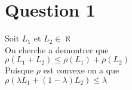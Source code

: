 \section{Question 1}
Soit $L_1$ et $L_2 \in \aleph$ \\

On cherche a demontrer que \\
$\rho(L_1 + L_2) \leq   \rho(L_1)  + \rho(L_2)$\\

Puisque $\rho$ est convexe on a que \\
$\rho(\lambda  L_1 + (1-\lambda)L_2) \leq   \lambda$


